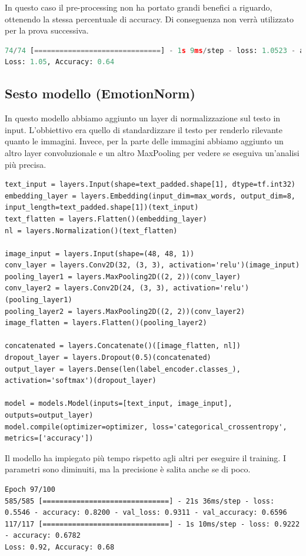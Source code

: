 \documentclass{article}
\begin{document}
In questo caso il pre-processing non ha portato grandi benefici a riguardo, ottenendo la stessa percentuale di accuracy. Di conseguenza non verrà utilizzato per la prova successiva.
\begin{lstlisting}[language=Python, caption=Risultati modello normalizzazione migliorata]
74/74 [==============================] - 1s 9ms/step - loss: 1.0523 - accuracy: 0.6446
Loss: 1.05, Accuracy: 0.64
\end{lstlisting}


\subsection{Sesto modello (EmotionNorm)}
In questo modello abbiamo aggiunto un layer di normalizzazione sul testo in input. L'obbiettivo era quello di standardizzare il testo per renderlo rilevante quanto le immagini. Invece, per la parte delle immagini abbiamo aggiunto un altro layer convoluzionale e un altro MaxPooling per vedere se eseguiva un'analisi più precisa. 

\begin{lstlisting}
text_input = layers.Input(shape=text_padded.shape[1], dtype=tf.int32)
embedding_layer = layers.Embedding(input_dim=max_words, output_dim=8, input_length=text_padded.shape[1])(text_input)
text_flatten = layers.Flatten()(embedding_layer)
nl = layers.Normalization()(text_flatten)

image_input = layers.Input(shape=(48, 48, 1))
conv_layer = layers.Conv2D(32, (3, 3), activation='relu')(image_input)
pooling_layer1 = layers.MaxPooling2D((2, 2))(conv_layer)
conv_layer2 = layers.Conv2D(24, (3, 3), activation='relu')(pooling_layer1)
pooling_layer2 = layers.MaxPooling2D((2, 2))(conv_layer2)
image_flatten = layers.Flatten()(pooling_layer2)

concatenated = layers.Concatenate()([image_flatten, nl])
dropout_layer = layers.Dropout(0.5)(concatenated)
output_layer = layers.Dense(len(label_encoder.classes_), activation='softmax')(dropout_layer)

model = models.Model(inputs=[text_input, image_input], outputs=output_layer)
model.compile(optimizer=optimizer, loss='categorical_crossentropy', metrics=['accuracy'])
\end{lstlisting}

Il modello ha impiegato più tempo rispetto agli altri per eseguire il training. I parametri sono diminuiti, ma la precisione è salita anche se di poco.

\begin{lstlisting}
Epoch 97/100
585/585 [==============================] - 21s 36ms/step - loss: 0.5546 - accuracy: 0.8200 - val_loss: 0.9311 - val_accuracy: 0.6596
117/117 [==============================] - 1s 10ms/step - loss: 0.9222 - accuracy: 0.6782
Loss: 0.92, Accuracy: 0.68
\end{lstlisting}
\end{document}

